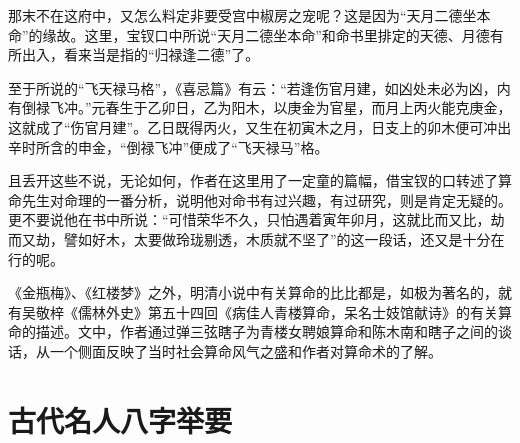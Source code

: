 \documentclass[a5paper,oneside,12pt]{ctexbook}
\begin{document}
那末不在这府中，又怎么料定非要受宫中椒房之宠呢？这是因为“天月二德坐本命”的缘故。这里，宝钗口中所说“天月二德坐本命”和命书里排定的天德、月德有所出入，看来当是指的“归禄逢二德”了。

至于所说的“飞天禄马格”，《喜忌篇》有云：“若逢伤官月建，如凶处未必为凶，内有倒禄飞冲。”元春生于乙卯日，乙为阳木，以庚金为官星，而月上丙火能克庚金，这就成了“伤官月建”。乙日既得丙火，又生在初寅木之月，日支上的卯木便可冲出辛时所含的申金，“倒禄飞冲”便成了“飞天禄马”格。

且丢开这些不说，无论如何，作者在这里用了一定童的篇幅，借宝钗的口转述了算命先生对命理的一番分析，说明他对命书有过兴趣，有过研究，则是肯定无疑的。更不要说他在书中所说：“可惜荣华不久，只怕遇着寅年卯月，这就比而又比，劫而又劫，譬如好木，太要做玲珑剔透，木质就不坚了”的这一段话，还又是十分在行的呢。

《金瓶梅》、《红楼梦》之外，明清小说中有关算命的比比都是，如极为著名的，就有吴敬梓《儒林外史》第五十四回《病佳人青楼算命，呆名士妓馆献诗》的有关算命的描述。文中，作者通过弹三弦瞎子为青楼女聘娘算命和陈木南和瞎子之间的谈话，从一个侧面反映了当时社会算命风气之盛和作者对算命术的了解。

\section{古代名人八字举要}
\end{document}
